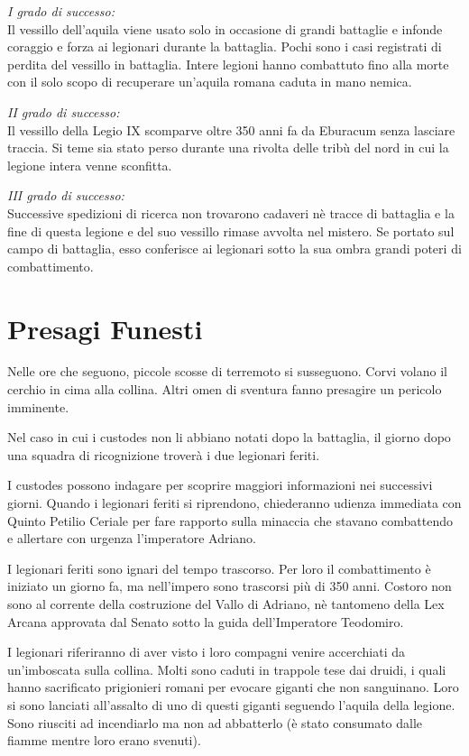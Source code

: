 \documentclass[11.5pt,twocolumn]{article}
\begin{document}
\emph{I grado di successo:}\\
Il vessillo dell'aquila viene usato solo in occasione di grandi battaglie e infonde coraggio e forza ai legionari durante la battaglia.
Pochi sono i casi registrati di perdita del vessillo in battaglia.
Intere legioni hanno combattuto fino alla morte con il solo scopo di recuperare un'aquila romana caduta in mano nemica.

\emph{II grado di successo:}\\
Il vessillo della Legio IX scomparve oltre 350 anni fa da Eburacum senza lasciare traccia.
Si teme sia stato perso durante una rivolta delle trib\`{u} del nord in cui la legione intera venne sconfitta.

\emph{III grado di successo:}\\
Successive spedizioni di ricerca non trovarono cadaveri n\`{e} tracce di battaglia e la fine di questa legione e del suo vessillo rimase avvolta nel mistero.
Se portato sul campo di battaglia, esso conferisce ai legionari sotto la sua ombra grandi poteri di combattimento.


\section{Presagi Funesti}
%
Nelle ore che seguono, piccole scosse di terremoto si susseguono.
Corvi volano il cerchio in cima alla collina.
Altri omen di sventura fanno presagire un pericolo imminente.

Nel caso in cui i custodes non li abbiano notati dopo la battaglia, il giorno dopo una squadra di ricognizione trover\`{a} i due legionari feriti.

I custodes possono indagare per scoprire maggiori informazioni nei successivi giorni.
Quando i legionari feriti si riprendono, chiederanno udienza immediata con Quinto Petilio Ceriale per fare rapporto sulla minaccia che stavano combattendo e allertare con urgenza l'imperatore Adriano.

I legionari feriti sono ignari del tempo trascorso.
Per loro il combattimento \`{e} iniziato un giorno fa, ma nell'impero sono trascorsi pi\`{u} di 350 anni.
Costoro non sono al corrente della costruzione del Vallo di Adriano, n\`{e} tantomeno della Lex Arcana approvata dal Senato sotto la guida dell'Imperatore Teodomiro.

I legionari riferiranno di aver visto i loro compagni venire accerchiati da un'imboscata sulla collina.
Molti sono caduti in trappole tese dai druidi, i quali hanno sacrificato prigionieri romani per evocare giganti che non sanguinano.
Loro si sono lanciati all'assalto di uno di questi giganti seguendo l'aquila della legione.
Sono riusciti ad incendiarlo ma non ad abbatterlo (\`{e} stato consumato dalle fiamme mentre loro erano svenuti).
\end{document}
